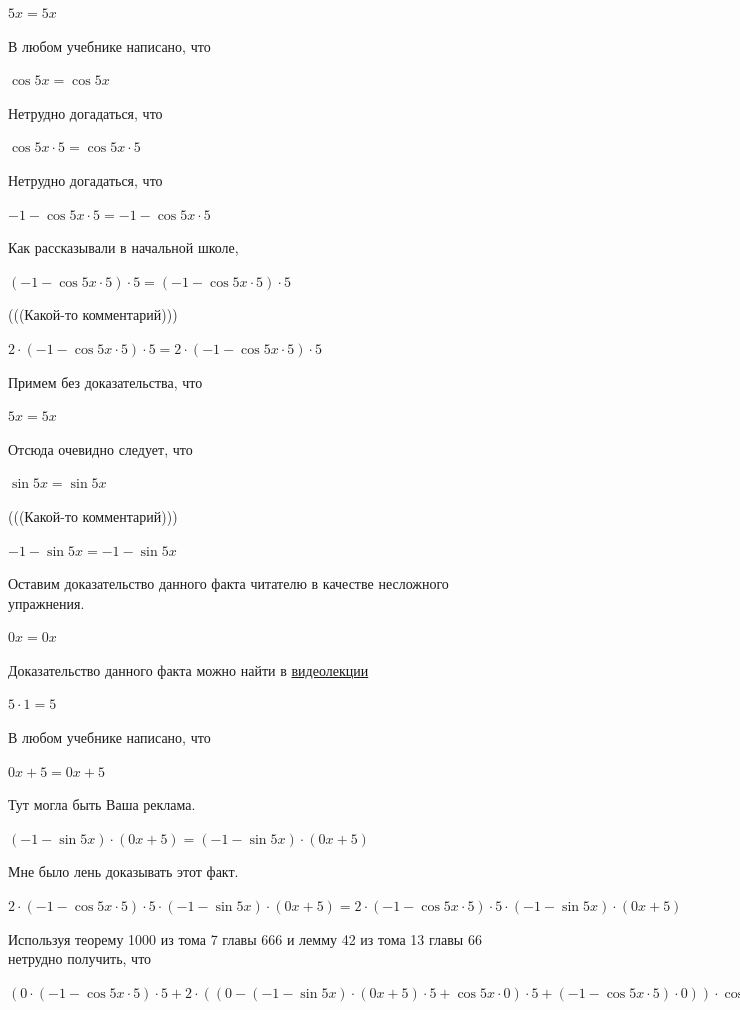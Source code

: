 \documentclass[12pt,a4paper,fleqn]{article}
\theoremstyle{definition}
\begin{document}
$ 5  x  =  5  x $

В любом учебнике написано, что 

$\cos 5  x  = \cos 5  x $

Нетрудно догадаться, что 

$\cos 5  x  \cdot  5  = \cos 5  x  \cdot  5 $

Нетрудно догадаться, что 

$ -1  - \cos 5  x  \cdot  5  =  -1  - \cos 5  x  \cdot  5 $

Как рассказывали в начальной школе, 

$( -1  - \cos 5  x  \cdot  5 ) \cdot  5  = ( -1  - \cos 5  x  \cdot  5 ) \cdot  5 $

(((Какой-то комментарий))) 

$ 2  \cdot ( -1  - \cos 5  x  \cdot  5 ) \cdot  5  =  2  \cdot ( -1  - \cos 5  x  \cdot  5 ) \cdot  5 $

Примем без доказательства, что 

$ 5  x  =  5  x $

Отсюда очевидно следует, что 

$\sin 5  x  = \sin 5  x $

(((Какой-то комментарий))) 

$ -1  - \sin 5  x  =  -1  - \sin 5  x $

Оставим доказательство данного факта читателю в качестве несложного упражнения. 

$ 0  x  =  0  x $

Доказательство данного факта можно найти в \href{https://www.youtube.com/watch?v=dQw4w9WgXcQ}{видеолекции} 

$ 5  \cdot  1  =  5 $

В любом учебнике написано, что 

$ 0  x  +  5  =  0  x  +  5 $

Тут могла быть Ваша реклама. 

$( -1  - \sin 5  x ) \cdot ( 0  x  +  5 ) = ( -1  - \sin 5  x ) \cdot ( 0  x  +  5 )$

Мне было лень доказывать этот факт.

$ 2  \cdot ( -1  - \cos 5  x  \cdot  5 ) \cdot  5  \cdot ( -1  - \sin 5  x ) \cdot ( 0  x  +  5 ) =  2  \cdot ( -1  - \cos 5  x  \cdot  5 ) \cdot  5  \cdot ( -1  - \sin 5  x ) \cdot ( 0  x  +  5 )$

Используя теорему 1000 из тома 7 главы 666 и лемму 42 из тома 13 главы 66 нетрудно получить, что 

$( 0  \cdot ( -1  - \cos 5  x  \cdot  5 ) \cdot  5  +  2  \cdot (( 0  - ( -1  - \sin 5  x ) \cdot ( 0  x  +  5 ) \cdot  5  + \cos 5  x  \cdot  0 ) \cdot  5  + ( -1  - \cos 5  x  \cdot  5 ) \cdot  0 )) \cdot \cos 5  x  +  2  \cdot ( -1  - \cos 5  x  \cdot  5 ) \cdot  5  \cdot ( -1  - \sin 5  x ) \cdot ( 0  x  +  5 ) = ( 0  \cdot ( -1  - \cos 5  x  \cdot  5 ) \cdot  5  +  2  \cdot (( 0  - ( -1  - \sin 5  x ) \cdot ( 0  x  +  5 ) \cdot  5  + \cos 5  x  \cdot  0 ) \cdot  5  + ( -1  - \cos 5  x  \cdot  5 ) \cdot  0 )) \cdot \cos 5  x  +  2  \cdot ( -1  - \cos 5  x  \cdot  5 ) \cdot  5  \cdot ( -1  - \sin 5  x ) \cdot ( 0  x  +  5 )$
\end{document}
